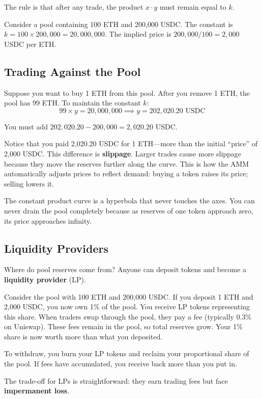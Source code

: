 \documentclass[11pt,a4paper]{article}
\newcommand{\keyword}[1]{\textbf{\textcolor{AccentOrange}{#1}}}
\begin{document}
The rule is that after any trade, the product $x \cdot y$ must remain equal to $k$.

Consider a pool containing 100 ETH and 200,000 USDC. The constant is $k = 100 \times 200{,}000 = 20{,}000{,}000$. The implied price is $200{,}000 / 100 = 2{,}000$ USDC per ETH.

\subsection{Trading Against the Pool}

Suppose you want to buy 1 ETH from this pool. After you remove 1 ETH, the pool has 99 ETH. To maintain the constant $k$:
\[
99 \times y = 20{,}000{,}000 \implies y = 202{,}020.20 \text{ USDC}
\]

You must add $202{,}020.20 - 200{,}000 = 2{,}020.20$ USDC.

Notice that you paid 2,020.20 USDC for 1 ETH---more than the initial ``price'' of 2,000 USDC. This difference is \keyword{slippage}. Larger trades cause more slippage because they move the reserves further along the curve. This is how the AMM automatically adjusts prices to reflect demand: buying a token raises its price; selling lowers it.

The constant product curve is a hyperbola that never touches the axes. You can never drain the pool completely because as reserves of one token approach zero, its price approaches infinity.

\subsection{Liquidity Providers}

Where do pool reserves come from? Anyone can deposit tokens and become a \keyword{liquidity provider} (LP).

Consider the pool with 100 ETH and 200,000 USDC. If you deposit 1 ETH and 2,000 USDC, you now own 1\% of the pool. You receive LP tokens representing this share. When traders swap through the pool, they pay a fee (typically 0.3\% on Uniswap). These fees remain in the pool, so total reserves grow. Your 1\% share is now worth more than what you deposited.

To withdraw, you burn your LP tokens and reclaim your proportional share of the pool. If fees have accumulated, you receive back more than you put in.

The trade-off for LPs is straightforward: they earn trading fees but face \keyword{impermanent loss}.
\end{document}
